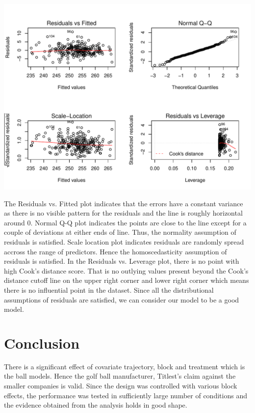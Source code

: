 \documentclass{article}\usepackage[]{graphicx}\usepackage[]{color}
\makeatletter
\def\maxwidth{ %
  \ifdim\Gin@nat@width>\linewidth
    \linewidth
  \else
    \Gin@nat@width
  \fi
}
\newenvironment{knitrout}{}{} %
\makeatother
\begin{document}
\begin{knitrout}
\color{fgcolor}
\includegraphics[width=\maxwidth]{figure/diagnostics-1} 

\end{knitrout}
The Residuals vs. Fitted plot indicates that the errors have a constant variance as there is no visible pattern for the residuals and the line is roughly horizontal around 0. Normal Q-Q plot indicates the points are close to the line except for a couple of deviations at either ends of line. Thus, the normality assumption of residuals is satisfied. Scale location plot indicates residuals are randomly spread accross the range of predictors. Hence the homoscedasticity assumption of residuals is satisfied. In the Residuals vs. Leverage plot, there is no point with high Cook's distance score. That is no outlying values present beyond the Cook's distance cutoff line on the upper right corner and lower right corner which means there is no influential point in the dataset. Since all the distributional assumptions of residuals are satisfied, we can consider our model to be a good model.
\section*{Conclusion}
There is a significant effect of covariate trajectory, block and treatment which is the ball models. Hence the golf ball manufacturer, Titlest's claim against the smaller companies is valid. Since the design was controlled with various block effects, the performance was tested in sufficiently large number of conditions and the evidence obtained from the analysis holds in good shape.
\end{document}
